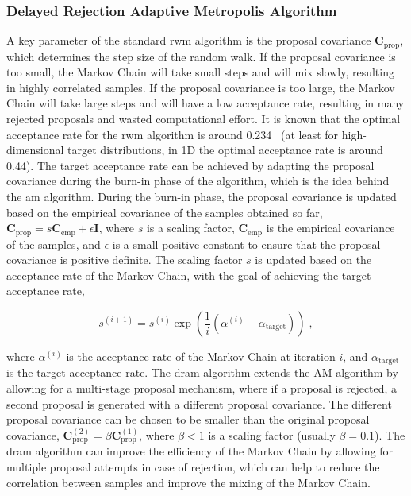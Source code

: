 \subsubsection{Delayed Rejection Adaptive Metropolis Algorithm}
A key parameter of the standard \gls{rwm} algorithm is the proposal covariance $\mathbf{C}_{\mathrm{prop}}$, which determines the step size of the random walk. If the proposal covariance is too small, the Markov Chain will take small steps and will mix slowly, resulting in highly correlated samples. If the proposal covariance is too large, the Markov Chain will take large steps and will have a low acceptance rate, resulting in many rejected proposals and wasted computational effort. It is known that the optimal acceptance rate for the \gls{rwm} algorithm is around 0.234~\cite{uq_theory} (at least for high-dimensional target distributions, in 1D the optimal acceptance rate is around 0.44). The target acceptance rate can be achieved by adapting the proposal covariance during the burn-in phase of the algorithm, which is the idea behind the \gls{am} algorithm. During the burn-in phase, the proposal covariance is updated based on the empirical covariance of the samples obtained so far, $\mathbf{C}_{\mathrm{prop}} = s \mathbf{C}_{\mathrm{emp}} + \epsilon \mathbf{I}$, where $s$ is a scaling factor, $\mathbf{C}_{\mathrm{emp}}$ is the empirical covariance of the samples, and $\epsilon$ is a small positive constant to ensure that the proposal covariance is positive definite. The scaling factor $s$ is updated based on the acceptance rate of the Markov Chain, with the goal of achieving the target acceptance rate,

\begin{equation}
  s^{(i+1)} = s^{(i)} \exp\left(\frac{1}{i}(\alpha^{(i)} - \alpha_{\mathrm{target}})\right)\;,
\end{equation}

where $\alpha^{(i)}$ is the acceptance rate of the Markov Chain at iteration $i$, and $\alpha_{\mathrm{target}}$ is the target acceptance rate. The \gls{dram} algorithm extends the AM algorithm by allowing for a multi-stage proposal mechanism, where if a proposal is rejected, a second proposal is generated with a different proposal covariance. The different proposal covariance can be chosen to be smaller than the original proposal covariance, $\mathbf{C}_{\mathrm{prop}}^{(2)} = \beta \mathbf{C}_{\mathrm{prop}}^{(1)}$, where $\beta < 1$ is a scaling factor (usually $\beta = 0.1$). The \gls{dram} algorithm can improve the efficiency of the Markov Chain by allowing for multiple proposal attempts in case of rejection, which can help to reduce the correlation between samples and improve the mixing of the Markov Chain.

